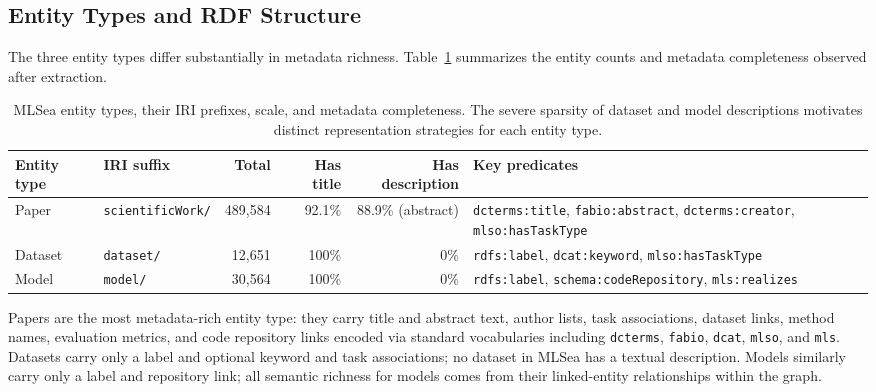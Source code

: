 \subsection{Entity Types and RDF Structure}
\label{subsec:entity_types}

The three entity types differ substantially in metadata richness.
Table~\ref{tab:entity_types} summarizes the entity counts and metadata
completeness observed after extraction.

\begin{table}[htbp]
  \centering
  \caption{MLSea entity types, their IRI prefixes, scale, and metadata
    completeness. The severe sparsity of dataset and model descriptions
    motivates distinct representation strategies for each entity type.}
  \label{tab:entity_types}
  \begin{tabular}{llrrrl}
    \toprule
    Entity type & IRI suffix & Total & Has title & Has description & Key predicates \\
    \midrule
    Paper   & \texttt{scientificWork/} & 489{,}584 & 92.1\% & 88.9\% (abstract)
            & \texttt{dcterms:title}, \texttt{fabio:abstract},
              \texttt{dcterms:creator}, \texttt{mlso:hasTaskType} \\
    Dataset & \texttt{dataset/}        & 12{,}651  & 100\%  & 0\%
            & \texttt{rdfs:label}, \texttt{dcat:keyword},
              \texttt{mlso:hasTaskType} \\
    Model   & \texttt{model/}          & 30{,}564  & 100\%  & 0\%
            & \texttt{rdfs:label}, \texttt{schema:codeRepository},
              \texttt{mls:realizes} \\
    \bottomrule
  \end{tabular}
\end{table}

Papers are the most metadata-rich entity type: they carry title and abstract
text, author lists, task associations, dataset links, method names, evaluation
metrics, and code repository links encoded via standard vocabularies including
\texttt{dcterms}, \texttt{fabio}, \texttt{dcat}, \texttt{mlso}, and
\texttt{mls}.
Datasets carry only a label and optional keyword and task associations; no
dataset in MLSea has a textual description.
Models similarly carry only a label and repository link; all semantic richness
for models comes from their linked-entity relationships within the graph.

